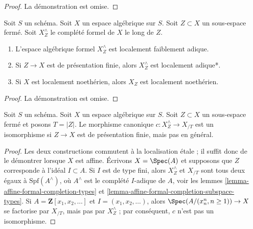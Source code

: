 \begin{proof}
La démonstration est omise.
\end{proof}

\begin{lemma}
\label{lemma-formal-completion-subspace-types}
Soit $S$ un schéma. Soit $X$ un espace algébrique sur $S$.
Soit $Z \subset X$ un sous-espace fermé. Soit $X^\wedge_Z$ le
complété formel de $X$ le long de $Z$.
\begin{enumerate}
\item L'espace algébrique formel $X^\wedge_Z$ est localement faiblement adique.
\item Si $Z \to X$ est de présentation finie,
alors $X^\wedge_Z$ est localement adique*.
\item Si $X$ est localement noethérien, alors $X_Z$ est localement
noethérien.
\end{enumerate}
\end{lemma}

\begin{proof}
La démonstration est omise.
\end{proof}

\begin{lemma}
\label{lemma-when-isomorphism}
Soit $S$ un schéma. Soit $X$ un espace algébrique sur $S$.
Soit $Z \subset X$ un sous-espace fermé et posons $T = |Z|$. Le
morphisme canonique $c : X^\wedge_Z \to X_{/T}$ est un isomorphisme si $Z \to X$
est de présentation finie, mais pas en général.
\end{lemma}

\begin{proof}
Les deux constructions commutent à la localisation \'etale ; il suffit donc
de le démontrer lorsque $X$ est affine. Écrivons $X = \Spec(A)$ et supposons que $Z$ corresponde
à l'idéal $I \subset A$. Si $I$ est de type fini, alors
$X^\wedge_Z$ et $X_{/T}$ sont tous deux égaux à $\text{Spf}(A^\wedge)$, où $A^\wedge$
est le complété $I$-adique de $A$, voir les
lemmes \ref{lemma-affine-formal-completion-types} et
\ref{lemma-affine-formal-completion-subspace-types}.
Si $A = \mathbf{Z}[x_1, x_2, \ldots]$ et $I = (x_1, x_2, \ldots)$,
alors $\Spec(A/(x_n^n, n \geq 1)) \to X$ se factorise par $X_{/T}$,
mais pas par $X^\wedge_Z$ ; par conséquent, $c$ n'est pas un isomorphisme.
\end{proof}













